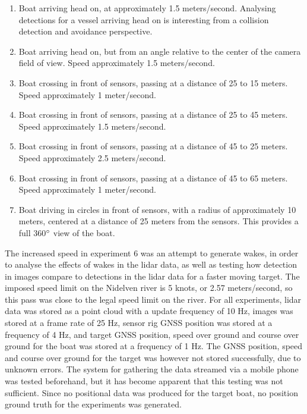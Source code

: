 \begin{enumerate}
	\item Boat arriving head on, at approximately 1.5 meters/second. Analysing detections for a vessel arriving head on is interesting from a collision detection and avoidance perspective.
	\item Boat arriving head on, but from an angle relative to the center of the camera field of view. Speed approximately 1.5 meters/second.
	\item Boat crossing in front of sensors, passing at a distance of 25 to 15 meters. Speed approximately 1 meter/second.
	\item Boat crossing in front of sensors, passing at a distance of 25 to 45 meters. Speed approximately 1.5 meters/second.
	\item Boat crossing in front of sensors, passing at a distance of 45 to 25 meters. Speed approximately 2.5 meters/second. 
	\item Boat crossing in front of sensors, passing at a distance of 45 to 65 meters. Speed approximately 1 meter/second.
	\item Boat driving in circles in front of sensors, with a radius of approximately 10 meters, centered at a distance of 25 meters from the sensors. This provides a full 360$\degree$ view of the boat.
\end{enumerate}
The increased speed in experiment 6 was an attempt to generate wakes, in order to analyse the effects of wakes in the lidar data, as well as testing how detection in images compare to detections in the lidar data for a faster moving target. The imposed speed limit on the Nidelven river is 5 knots, or 2.57 meters/second, so this pass was close to the legal speed limit on the river. For all experiments, lidar data was stored as a point cloud with a update frequency of 10 Hz, images was stored at a frame rate of 25 Hz, sensor rig GNSS position was stored at a frequency of 4 Hz, and target GNSS position, speed over ground and course over ground for the boat was stored at a frequency of 1 Hz. The GNSS position, speed and course over ground for the target was however not stored successfully, due to unknown errors. The system for gathering the data streamed via a mobile phone was tested beforehand, but it has become apparent that this testing was not sufficient. Since no positional data was produced for the target boat, no position ground truth for the experiments was generated.
\cleardoublepage